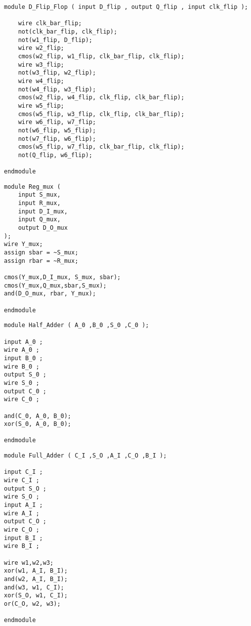 \begin{lstlisting}[style=verilogStyle, caption=D Flip-Flop in Verilog, label=verilog_dflipflop]
module D_Flip_Flop ( input D_flip , output Q_flip , input clk_flip );
	
	wire clk_bar_flip; 
	not(clk_bar_flip, clk_flip);
	not(w1_flip, D_flip);	  
	wire w2_flip;
	cmos(w2_flip, w1_flip, clk_bar_flip, clk_flip);	
	wire w3_flip;
	not(w3_flip, w2_flip); 
	wire w4_flip;
	not(w4_flip, w3_flip);
	cmos(w2_flip, w4_flip, clk_flip, clk_bar_flip);	 
	wire w5_flip;
	cmos(w5_flip, w3_flip, clk_flip, clk_bar_flip);
	wire w6_flip, w7_flip;
	not(w6_flip, w5_flip);
	not(w7_flip, w6_flip);
	cmos(w5_flip, w7_flip, clk_bar_flip, clk_flip);	 
	not(Q_flip, w6_flip);

endmodule
\end{lstlisting}

\begin{lstlisting}[style=verilogStyle, caption=RegisterMux in Verilog, label=verilog_regmux]
module Reg_mux (
    input S_mux,
    input R_mux,
    input D_I_mux,
    input Q_mux,
    output D_O_mux
);			  
wire Y_mux;	
assign sbar = ~S_mux;
assign rbar = ~R_mux;  

cmos(Y_mux,D_I_mux, S_mux, sbar);
cmos(Y_mux,Q_mux,sbar,S_mux);
and(D_O_mux, rbar, Y_mux);

endmodule  
\end{lstlisting}

\begin{lstlisting}[style=verilogStyle, caption=Half Adder in Verilog, label=verilog_halfadder]
module Half_Adder ( A_0 ,B_0 ,S_0 ,C_0 );

input A_0 ;
wire A_0 ;
input B_0 ;
wire B_0 ;
output S_0 ;
wire S_0 ;
output C_0 ;
wire C_0 ;

and(C_0, A_0, B_0);
xor(S_0, A_0, B_0);

endmodule
\end{lstlisting}

\begin{lstlisting}[style=verilogStyle, caption=Full Adder in Verilog, label=verilog_fulladder]
module Full_Adder ( C_I ,S_O ,A_I ,C_O ,B_I );

input C_I ;
wire C_I ;
output S_O ;
wire S_O ;
input A_I ;
wire A_I ;
output C_O ;
wire C_O ;
input B_I ;
wire B_I ;

wire w1,w2,w3;
xor(w1, A_I, B_I);
and(w2, A_I, B_I); 
and(w3, w1, C_I);
xor(S_O, w1, C_I);
or(C_O, w2, w3); 

endmodule
\end{lstlisting}

